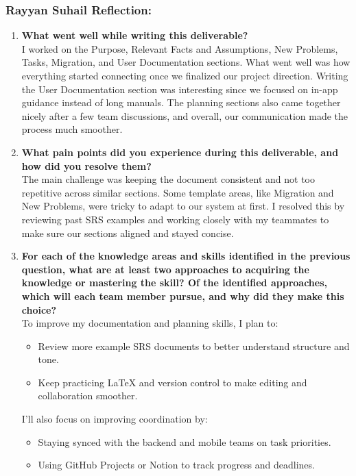 \subsubsection*{Rayyan Suhail Reflection:}
\begin{enumerate}
  \item \textbf{What went well while writing this deliverable?} \\
  I worked on the Purpose, Relevant Facts and Assumptions, New Problems, Tasks, Migration, and User Documentation sections. What went well was how everything started connecting once we finalized our project direction. Writing the User Documentation section was interesting since we focused on in-app guidance instead of long manuals. The planning sections also came together nicely after a few team discussions, and overall, our communication made the process much smoother.

  \item \textbf{What pain points did you experience during this deliverable, and how did you resolve them?} \\
  The main challenge was keeping the document consistent and not too repetitive across similar sections. Some template areas, like Migration and New Problems, were tricky to adapt to our system at first. I resolved this by reviewing past SRS examples and working closely with my teammates to make sure our sections aligned and stayed concise.

  \item \textbf{For each of the knowledge areas and skills identified in the previous question, what are at least two approaches to acquiring the knowledge or mastering the skill? Of the identified approaches, which will each team member pursue, and why did they make this choice?} \\
  To improve my documentation and planning skills, I plan to:
  \begin{itemize}
    \item Review more example SRS documents to better understand structure and tone.  
    \item Keep practicing LaTeX and version control to make editing and collaboration smoother.
  \end{itemize}
  I’ll also focus on improving coordination by:
  \begin{itemize}
    \item Staying synced with the backend and mobile teams on task priorities.  
    \item Using GitHub Projects or Notion to track progress and deadlines.
  \end{itemize}
\end{enumerate}





